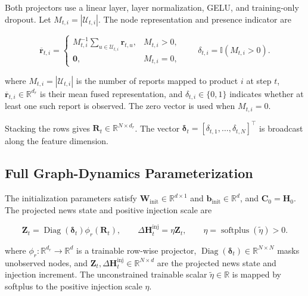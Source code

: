 \documentclass[letterpaper]{article} %
\begin{document}
Both projectors use a linear layer, layer normalization, GELU, and training-only dropout. Let \(M_{t,i}=|\mathcal U_{t,i}|\). The node representation and presence indicator are

\begin{equation}
\overline{\mathbf r}_{t,i}
=
\begin{cases}
M_{t,i}^{-1}\sum_{u\in\mathcal U_{t,i}}\mathbf r_{t,u},
&M_{t,i}>0,\\
\mathbf 0,&M_{t,i}=0,
\end{cases}
\qquad
\delta_{t,i}=\mathbb{I}(M_{t,i}>0).
\label{eq:app-node-aggregation}
\end{equation}

where \(M_{t,i}=|\mathcal U_{t,i}|\) is the number of reports mapped to product \(i\) at step \(t\), \(\overline{\mathbf r}_{t,i}\in\mathbb R^{d_r}\) is their mean fused representation, and \(\delta_{t,i}\in\{0,1\}\) indicates whether at least one such report is observed. The zero vector is used when \(M_{t,i}=0\).

Stacking the rows gives \(\mathbf R_t\in\mathbb R^{N\times d_r}\). The vector \(\boldsymbol\delta_t=[\delta_{t,1},\ldots,\delta_{t,N}]^\top\) is broadcast along the feature dimension.

\subsection{Full Graph-Dynamics Parameterization}
\label{app:full-dynamics}

The initialization parameters satisfy \(\mathbf W_{\mathrm{init}}\in\mathbb R^{d\times1}\) and \(\mathbf b_{\mathrm{init}}\in\mathbb R^d\), and \(\mathbf C_0=\mathbf H_0\). The projected news state and positive injection scale are

\begin{equation}
\mathbf Z_t=\operatorname{Diag}(\boldsymbol\delta_t)\phi_r(\mathbf R_t),
\qquad
\Delta\mathbf H_t^{\mathrm{inj}}=\eta\mathbf Z_t,
\qquad
\eta=\operatorname{softplus}(\widetilde\eta)>0.
\label{eq:app-injection}
\end{equation}

where \(\phi_r:\mathbb R^{d_r}\rightarrow\mathbb R^d\) is a trainable row-wise projector, \(\operatorname{Diag}(\boldsymbol\delta_t)\in\mathbb R^{N\times N}\) masks unobserved nodes, and \(\mathbf Z_t,\Delta\mathbf H_t^{\mathrm{inj}}\in\mathbb R^{N\times d}\) are the projected news state and injection increment. The unconstrained trainable scalar \(\widetilde\eta\in\mathbb R\) is mapped by softplus to the positive injection scale \(\eta\).
\end{document}
